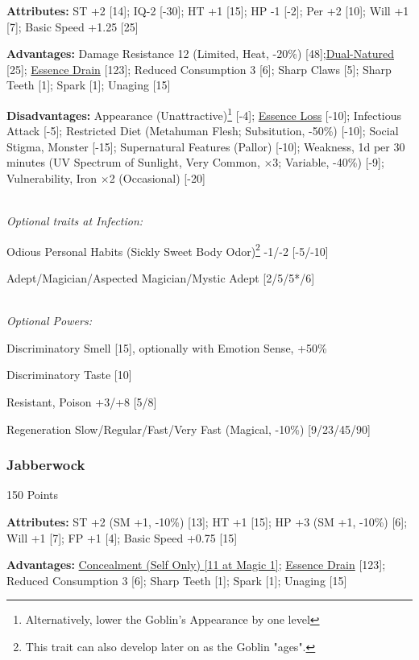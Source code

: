 \begin{multicols*}{3}
	\textbf{Attributes:}
	ST +2 [14]; IQ-2 [-30]; HT +1 [15]; HP -1 [-2]; Per +2 [10]; Will +1 [7]; Basic Speed +1.25 [25]
	
	\textbf{Advantages:}
	Damage Resistance 12 (Limited, Heat, -20\%) [48];\hyperref[dual_natured]{Dual-Natured} [25];  \hyperref[essence_drain]{Essence Drain} [123]; Reduced Consumption 3 [6]; Sharp Claws [5]; Sharp Teeth [1]; Spark [1]; Unaging [15]
	
	\textbf{Disadvantages:}	
	Appearance (Unattractive)\footnote{Alternatively, lower the Goblin's Appearance by one level} [-4]; \hyperref[essence_loss]{Essence Loss} [-10]; Infectious Attack [-5]; Restricted Diet (Metahuman Flesh; Subsitution, -50\%) [-10]; Social Stigma, Monster [-15]; Supernatural Features (Pallor) [-10]; Weakness, 1d per 30 minutes (UV Spectrum of Sunlight, Very Common, $\times$3; Variable, -40\%) [-9]; Vulnerability, Iron  $\times$2 (Occasional) [-20]
		
		
	\textit{\\Optional traits at Infection:}
	
	Odious Personal Habits (Sickly Sweet Body Odor)\footnote{This trait can also develop later on as the Goblin "ages".} -1/-2 [-5/-10]
	
	Adept/Magician/Aspected Magician/Mystic Adept [2/5/5*/6]
			
	\textit{\\Optional Powers:}
		
	Discriminatory Smell [15], optionally with Emotion Sense, +50\%
	
	Discriminatory Taste [10]
		
	Resistant, Poison +3/+8 [5/8]
	
	Regeneration Slow/Regular/Fast/Very Fast (Magical, -10\%) [9/23/45/90]
		
	\subsubsection{Jabberwock}\label{jabberwock}
	\begin{flushright}
		150 Points
	\end{flushright}
	
	\textbf{Attributes:}
	ST +2 (SM +1, -10\%) [13]; HT +1 [15]; HP +3 (SM +1, -10\%) [6]; Will +1 [7]; FP +1 [4]; Basic Speed +0.75 [15]
	
	\textbf{Advantages:}
	\hyperref[concealment_self_only]{Concealment (Self Only) [11 at Magic 1]}; \hyperref[essence_drain]{Essence Drain} [123]; Reduced Consumption 3 [6]; Sharp Teeth [1]; Spark [1]; Unaging [15]
	

\end{multicols*}
